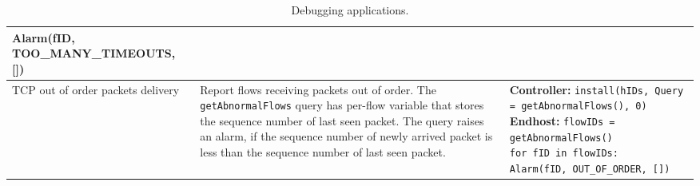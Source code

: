 \begin{table}[!h]
{\begin{tabular}{C{2cm} L{5cm} L{10cm}}
{						  	 \hspace{0.3cm} Alarm(fID, TOO\_MANY\_TIMEOUTS, []) 
						  	 } \\
\midrule
TCP out of order packets delivery
   &  Report flows receiving packets out of order. The {\tt getAbnormalFlows} query has per-flow variable that stores the sequence number of last seen packet. The query raises an alarm, if the sequence number of newly arrived packet is less than the sequence number of last seen packet. & \textbf{Controller:} \newline
				  	\texttt{install(hIDs, Query = getAbnormalFlows(), 0)} \newline
				  	\textbf{Endhost:} \newline
				  	 \texttt{flowIDs = getAbnormalFlows() \newline
				  	 for fID in flowIDs: \newline
				  	 \hspace{0.3cm} Alarm(fID, OUT\_OF\_ORDER, []) 
				  	 } \\
\bottomrule
\end{tabular}
}
\caption{Debugging applications.}
\label{tbl:apps}
\end{table}